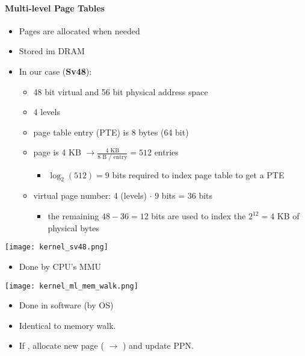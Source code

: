 \paragraph{Multi-level Page Tables}
\begin{itemize}
    \item Pages are allocated when needed
    \item Stored im DRAM
    \item In our case (\textbf{Sv48}):
          \begin{itemize}
              \item 48 bit virtual and 56 bit physical address space
              \item 4 levels
              \item page table entry (PTE) is 8 bytes (64 bit)
              \item page is 4 KB $\to \frac{\text{4 KB}}{\text{8 B / entry}} = 512$ entries
              \begin{itemize}
                \item $\log_{2}(512) = 9$ bits required to index page table to get a PTE
              \end{itemize}
              \item virtual page number: 4 (levels) $\cdot$ 9 bits = 36 bits
              \begin{itemize}
                \item the remaining $48-36=12$ bits are used to index the ${2}^{12} = 4$ KB of physical bytes
              \end{itemize}
          \end{itemize}
\end{itemize}

\begin{center}
    \texttt{[image: kernel\_sv48.png]}
\end{center}

\begin{itemize}
    \item Done by CPU's MMU
\end{itemize}
\begin{center}
    \texttt{[image: kernel\_ml\_mem\_walk.png]}
\end{center}

\newpar{}
\begin{itemize}
    \item Done in software (by OS)
    \item Identical to memory walk.
    \item If , allocate new page ( $\to$ ) and update PPN.\ %
\end{itemize}

